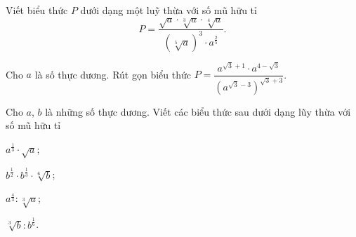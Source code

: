 \begin{bt}%
Viết biểu thức $P$ dưới dạng một luỹ thừa với số mũ hữu tỉ $$P=\dfrac{\sqrt{a}\cdot\sqrt[3]{a}\cdot\sqrt[4]{a}}{\left(\sqrt[5]{a}\right)^3\cdot a^{\tfrac{2}{5}}}.$$
\end{bt}

\begin{bt}%
	Cho $a$ là số thực dương. Rút gọn biểu thức
	$P = \dfrac{a^{\sqrt{3}+1} \cdot a^{4-\sqrt{3}}}{(a^{\sqrt{3}-3})^{\sqrt{3}+3}}$.
\end{bt}

\begin{bt}%
	Cho $a$, $b$ là những số thực dương. Viết các biểu thức sau dưới dạng lũy thừa với số mũ hữu tỉ
	\begin{listEX}[4]
		\item $a^{\frac{1}{3}}\cdot \sqrt{a}$;
		\item $b^{\frac{1}{2}}\cdot b^{\frac{1}{3}}\cdot \sqrt[6]{b}$;
		\item $a^{\frac{4}{3}}: \sqrt[3]{a}$;
		\item $\sqrt[3]{b}:b^{\frac{1}{6}}$.
	\end{listEX}
\end{bt}

